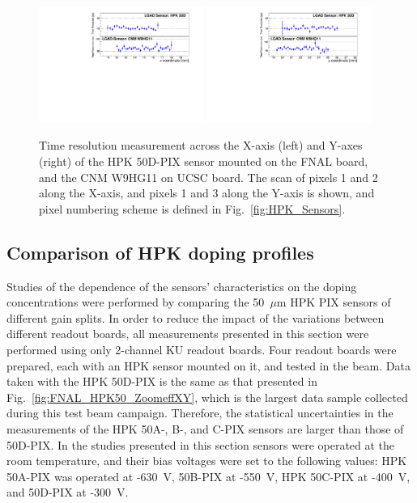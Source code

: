 \documentclass[preprint,1p]{elsarticle}
\begin{document}
\begin{figure}[htbp] 
\centering
\includegraphics[width=0.48\textwidth]{figs/HPK50DVsCNM_TimeResolution_vs_X.pdf} 
\includegraphics[width=0.48\textwidth]{figs/HPK50DVsCNM_TimeResolution_vs_Y.pdf} 
\caption{Time resolution measurement across the X-axis (left) and Y-axes (right) of the HPK 50D-PIX sensor mounted on the FNAL board, and the CNM W9HG11 on UCSC board. The scan of pixels 1 and 2 along the X-axis, and pixels 1 and 3 along the Y-axis is shown, and pixel numbering scheme is defined in Fig.~\ref{fig:HPK_Sensors}.} 
\label{fig:FNAL_HPK50_SigmaTXY} 
\end{figure} 




\subsection{Comparison of HPK doping profiles}

Studies of the dependence of the sensors' characteristics on the doping
concentrations were performed by comparing the 50~$\mu$m HPK PIX sensors of
different gain splits. In order to reduce the impact of the variations between
different readout boards, all measurements presented in this section were
performed using only 2-channel KU readout boards. Four readout boards were
prepared, each with an HPK sensor mounted on it, and tested in the beam. Data
taken with the HPK 50D-PIX is the same as that presented in
Fig.~\ref{fig:FNAL_HPK50_ZoomeffXY}, which is the largest data sample collected
during this test beam campaign. Therefore, the statistical uncertainties in the
measurements of the HPK 50A-, B-, and C-PIX sensors are larger than those of
50D-PIX. In the studies presented in this section sensors were operated at the
room temperature, and their bias voltages were set to the following values: HPK
50A-PIX was operated at -630~V, 50B-PIX at -550~V, HPK 50C-PIX at -400~V, and
50D-PIX at -300~V. 
\end{document}
